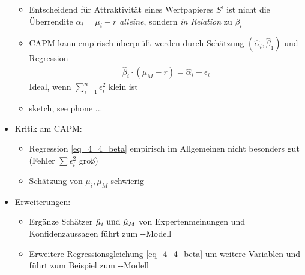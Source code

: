 \begin{itemize}
\begin{itemize}
		\item Entscheidend für Attraktivität eines Wertpapieres $S^i$ ist nicht die Überrendite $\alpha_i = \mu_i -r$ \emph{alleine}, sondern \emph{in Relation} zu $\beta_i$
		\item CAPM kann empirisch überprüft werden durch Schätzung $(\hat{\alpha}_i,\hat{\beta}_1)$ und Regression
		\begin{align*}
			\hat{\beta}_i\cdot (\mu_M - r) = \hat{\alpha}_i + \epsilon_i \tag{$\ast$}\label{eq_4_4_beta}
		\end{align*}
		Ideal, wenn $\sum_{i=1}^n \epsilon_i^2$ klein ist
		\item sketch, see phone ...
	\end{itemize}
	\item Kritik am CAPM:
	\begin{itemize}
		\item Regression \eqref{eq_4_4_beta} empirisch im Allgemeinen nicht besonders gut (Fehler $\sum \epsilon_i^2$ groß)
		\item Schätzung von $\mu_i, \mu_M$ schwierig
	\end{itemize}
	\item Erweiterungen:
	\begin{itemize}
		\item Ergänze Schätzer $\hat{\mu}_i \text{ und } \hat{\mu}_M$ von Expertenmeinungen und Konfidenzaussagen führt zum --Modell
		\item Erweitere Regressionsgleichung \eqref{eq_4_4_beta} um weitere Variablen und führt zum Beispiel zum --Modell 
	\end{itemize}
\end{itemize}
